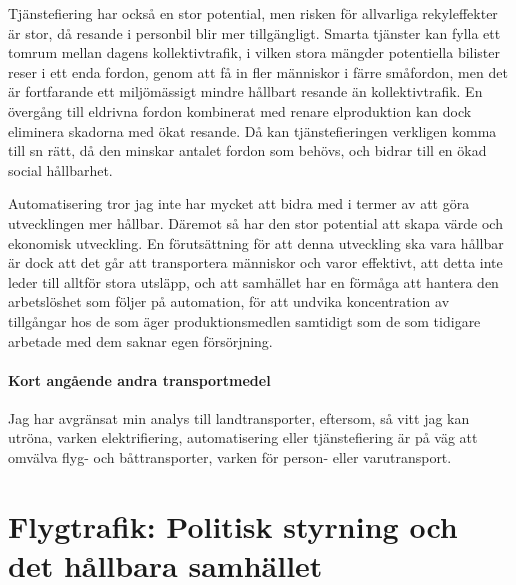 \documentclass{article}
\begin{document}
Tjänstefiering har också en stor potential, men risken för allvarliga rekyleffekter är stor, då resande i personbil blir mer tillgängligt. Smarta tjänster kan fylla ett tomrum mellan dagens kollektivtrafik, i vilken stora mängder potentiella bilister reser i ett enda fordon, genom att få in fler människor i färre småfordon, men det är fortfarande ett miljömässigt mindre hållbart resande än kollektivtrafik. En övergång till eldrivna fordon kombinerat med renare elproduktion kan dock eliminera skadorna med ökat resande. Då kan tjänstefieringen verkligen komma till sn rätt, då den minskar antalet fordon som behövs, och bidrar till en ökad social hållbarhet.

Automatisering tror jag inte har mycket att bidra med i termer av att göra utvecklingen mer hållbar. Däremot så har den stor potential att skapa värde och ekonomisk utveckling. En förutsättning för att denna utveckling ska vara hållbar är dock att det går att transportera människor och varor effektivt, att detta inte leder till alltför stora utsläpp, och att samhället har en förmåga att hantera den arbetslöshet som följer på automation, för att undvika koncentration av tillgångar hos de som äger produktionsmedlen samtidigt som de som tidigare arbetade med dem saknar egen försörjning.

\paragraph{Kort angående andra transportmedel}
Jag har avgränsat min analys till landtransporter, eftersom, så vitt jag kan utröna, varken elektrifiering, automatisering eller tjänstefiering är på väg att omvälva flyg- och båttransporter, varken för person- eller varutransport.


\clearpage
\section{Flygtrafik: Politisk styrning och det hållbara samhället}
\end{document}
